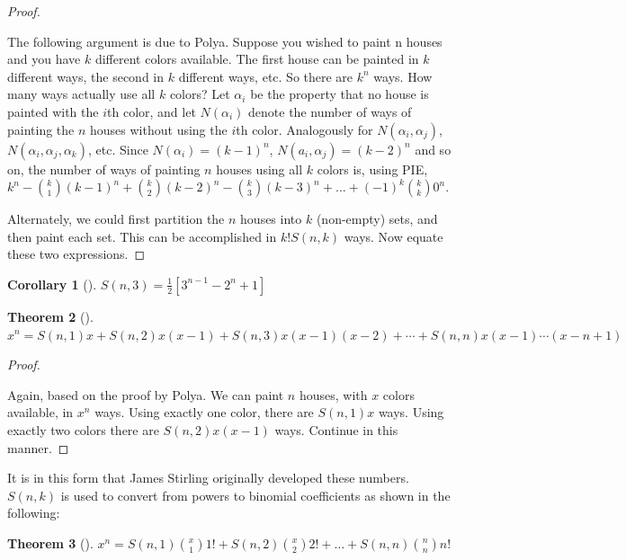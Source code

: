 \documentclass[10pt,]{book}
\theoremstyle{plain}
\newtheorem{theorem}{Theorem}[section]
\newtheorem{corollary}[theorem]{Corollary}
\theoremstyle{definition}
\theoremstyle{definition}
\theoremstyle{definition}
\theoremstyle{definition}
\numberwithin{equation}{chapter}
\begin{document}
\begin{proof}\hypertarget{proof-12}{}
\hypertarget{p-1190}{}%
The following argument is due to Polya. Suppose you wished to paint n houses and you have \(k\) different colors available. The first house can be painted in \(k\) different ways, the second in \(k\) different ways, etc. So there are \(k^{n}\) ways. How many ways actually use all \(k\) colors? Let \(\alpha_{i}\) be the property that no house is painted with the \(i\)th color, and let \(N(\alpha_{i})\) denote the number of ways of painting the \(n\) houses without using the \(i\)th color. Analogously for \(N(\alpha_{i},\alpha_{j})\), \(N(\alpha_{i},\alpha_{j},\alpha_{k})\), etc. Since \(N(\alpha_{i}) = (k - 1)^{n}\), \(N(a_{i},\alpha_{j}) = ( k - 2)^{n}\) and so on, the number of ways of painting \(n\) houses using all \(k\) colors is, using PIE, \(k^{n} -\binom{k}{1} \left(k - 1 \right)^{n} + \binom{k}{2} \left( k - 2 \right)^{n} - \binom{k}{3}      \left( k - 3 \right)^{n} + \ldots + \left( - 1 \right)^{k}\binom{k}{k} 0^{n}\).%
\par
\hypertarget{p-1191}{}%
Alternately, we could first partition the \(n\) houses into \(k\) (non-empty) sets, and then paint each set. This can be    accomplished in \(k!S(n,k)\) ways. Now equate these two expressions.%
\end{proof}
\begin{corollary}[{}]\label{corollary-1}
\hypertarget{p-1192}{}%
\(S\left( n,3 \right) = \frac{1}{2}\left\lbrack 3^{n - 1} - 2^{n} + 1 \right\rbrack\)%
\end{corollary}
\begin{theorem}[{}]\label{thm-stirling-polynomial}
\hypertarget{p-1193}{}%
\(x^{n} = S\left( n,1 \right)x + S\left( n,2 \right)x\left( x - 1 \right) + S\left( n,3 \right)x\left( x - 1 \right)\left( x - 2 \right) + \cdots
+ S\left( n,n \right)x\left( x - 1 \right)\cdots(x - n + 1)\)%
\end{theorem}
\begin{proof}\hypertarget{proof-13}{}
\hypertarget{p-1194}{}%
Again, based on the proof by Polya. We can paint \(n\) houses, with \(x\) colors available, in \(x^{n}\) ways. Using exactly one color, there are \(S\left( n,1 \right)x\) ways. Using exactly two colors there are \(S\left( n,2 \right)x(x - 1)\) ways. Continue in this manner.%
\end{proof}
\hypertarget{p-1195}{}%
It is in this form that James Stirling originally developed these numbers. \(S(n,k)\) is used to convert from powers to binomial  coefficients as shown in the following:%
\begin{theorem}[{}]\label{thm-stirling-polynomial2}
\hypertarget{p-1196}{}%
\(x^{n} = S\left( n,1 \right)\binom{x}{1}1! + S\left( n,2 \right) \binom{x}{2}2! + \ldots + S\left( n,n \right)\binom{n}{n} n!\)%
\end{theorem}
\typeout{************************************************}
\typeout{************************************************}
\end{document}
